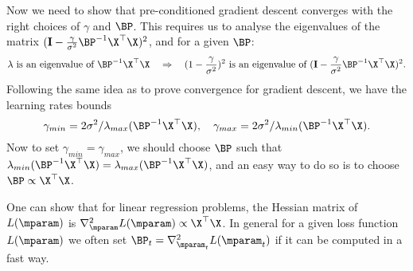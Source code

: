 Now we need to show that pre-conditioned gradient descent converges with the right choices of $\gamma$ and $\BP$. This requires us to analyse the eigenvalues of the matrix $(\mathbf{I} - \frac{\gamma}{\sigma^2} \BP^{-1} \X^\top \X)^2$, and for a given $\BP$:
$$ \lambda \text{ is an eigenvalue of } \BP^{-1} \X^\top \X \quad \Rightarrow \quad (1 - \frac{\gamma}{\sigma^2})^2 \text{ is an eigenvalue of } (\mathbf{I} - \frac{\gamma}{\sigma^2} \BP^{-1} \X^\top \X)^2.$$
Following the same idea as to prove convergence for gradient descent, we have the learning rates bounds
$$ \gamma_{min} = 2 \sigma^2 / \lambda_{max}(\BP^{-1} \X^\top \X), \quad \gamma_{max} = 2 \sigma^2 / \lambda_{min}(\BP^{-1} \X^\top \X) .$$
Now to set $\gamma_{min} = \gamma_{max}$, we should choose $\BP$ such that $\lambda_{min}(\BP^{-1} \X^\top \X) = \lambda_{max}(\BP^{-1} \X^\top \X)$, and an easy way to do so is to choose $\BP \propto \X^\top \X$.

One can show that for linear regression problems, the Hessian matrix of $L(\mparam)$ is $\nabla^2_{\mparam} L(\mparam) \propto \X^\top \X$. In general for a given loss function $L(\mparam)$ we often set $\BP_t = \nabla^2_{\mparam_t} L(\mparam_t)$ if it can be computed in a fast way.


